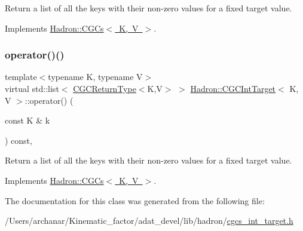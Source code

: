 Return a list of all the keys with their non-\/zero values for a fixed target value. 



Implements \mbox{\hyperlink{classHadron_1_1CGCs_a8d2d80be37b603359708ebdd5923ff47}{Hadron\+::\+C\+G\+Cs$<$ K, V $>$}}.

\mbox{\label{classHadron_1_1CGCIntTarget_a5946627ddb796961b97b7e0c57e32d83}} 
\subsubsection{\texorpdfstring{operator()()}{operator()()}\hspace{0.1cm}{\footnotesize\ttfamily [4/4]}}
{\footnotesize\ttfamily template$<$typename K, typename V$>$ \\
virtual std\+::list$<$ \mbox{\hyperlink{structHadron_1_1CGCReturnType}{C\+G\+C\+Return\+Type}}$<$K,V$>$ $>$ \mbox{\hyperlink{classHadron_1_1CGCIntTarget}{Hadron\+::\+C\+G\+C\+Int\+Target}}$<$ K, V $>$\+::operator() (\begin{DoxyParamCaption}\item[{const K \&}]{k }\end{DoxyParamCaption}) const\hspace{0.3cm}{\ttfamily [inline]}, {\ttfamily [virtual]}}



Return a list of all the keys with their non-\/zero values for a fixed target value. 



Implements \mbox{\hyperlink{classHadron_1_1CGCs_a8d2d80be37b603359708ebdd5923ff47}{Hadron\+::\+C\+G\+Cs$<$ K, V $>$}}.



The documentation for this class was generated from the following file\+:\begin{DoxyCompactItemize}
\item 
/\+Users/archanar/\+Kinematic\+\_\+factor/adat\+\_\+devel/lib/hadron/\mbox{\hyperlink{lib_2hadron_2cgcs__int__target_8h}{cgcs\+\_\+int\+\_\+target.\+h}}\end{DoxyCompactItemize}
